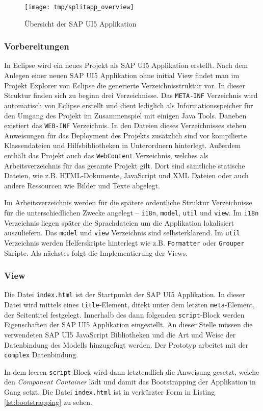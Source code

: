 \vspace{1em}
\begin{figure}[htb]
  \centering
  \texttt{[image: tmp/splitapp\_overview]}
  \caption[Übersicht der SAP UI5 Applikation]{Übersicht der SAP UI5 Applikation \cite{SAPSplitApp}}
  \label{fig:splitappoverview}
\end{figure}

\subsubsection{Vorbereitungen}
In Eclipse wird ein neues Projekt als SAP UI5 Applikation erstellt. Nach dem Anlegen einer neuen SAP UI5 Applikation ohne initial View findet man im Projekt Explorer von Eclipse die generierte Verzeichnisstruktur vor. In dieser Struktur finden sich zu beginn drei Verzeichnisse. Das \texttt{META-INF} Verzeichnis wird automatisch von Eclipse erstellt und dient lediglich als Informationsspeicher für den Umgang des Projekt im Zusammenspiel mit einigen Java Tools. Daneben existiert das \texttt{WEB-INF} Verzeichnis. In den Dateien dieses Verzeichnisses stehen Anweisungen für das Deployment des Projekts zusätzlich sind vor kompilierte Klassendateien und Hilfsbibliotheken in Unterordnern hinterlegt. Außerdem enthält das Projekt auch das \texttt{WebContent} Verzeichnis, welches als Arbeitsverzeichnis für das gesamte Projekt gilt. Dort sind sämtliche statische Dateien, wie z.B. HTML-Dokumente, JavaScript und XML Dateien oder auch andere Ressourcen wie Bilder und Texte abgelegt.\par Im Arbeitsverzeichnis werden für die spätere ordentliche Struktur Verzeichnisse für die unterschiedlichen Zwecke angelegt -- \texttt{i18n}, \texttt{model}, \texttt{util} und \texttt{view}. Im \texttt{i18n} Verzeichnis liegen später die Sprachdateien um die Applikation lokalisiert auszuliefern. Das \texttt{model} und \texttt{view} Verzeichnis sind selbsterklärend. Im \texttt{util} Verzeichnis werden Helferskripte hinterlegt wie z.B. \texttt{Formatter} oder \texttt{Grouper} Skripte. Als nächstes folgt die Implementierung der Views.

\subsubsection{View}
Die Datei \texttt{index.html} ist der Startpunkt der SAP UI5 Applikation. In dieser Datei wird mittels eines \texttt{title}-Element, direkt unter dem letzten \texttt{meta}-Element, der Seitentitel festgelegt. Innerhalb des dann folgenden \texttt{script}-Block werden Eigenschaften der SAP UI5 Applikation eingestellt. An dieser Stelle müssen die verwendeten SAP UI5 JavaScript Bibliotheken und die Art und Weise der Datenbindung des Modells hinzugefügt werden. Der Prototyp arbeitet mit der \texttt{complex} Datenbindung.\par In dem leeren \texttt{script}-Block wird dann letztendlich die Anweisung gesetzt, welche den \textit{Component Container} lädt und damit das Bootstrapping der Applikation in Gang setzt. Die Datei \texttt{index.html} ist in verkürzter Form in Listing \ref{lst:bootstrapping} zu sehen.
	

